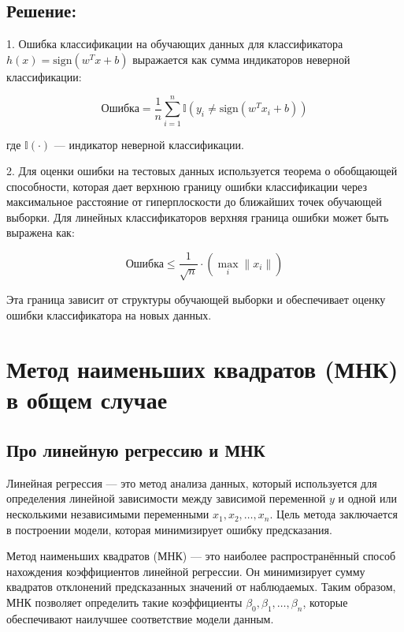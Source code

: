 \subsection*{Решение:}

1. Ошибка классификации на обучающих данных для классификатора \( h(x) = \text{sign}(w^T x + b) \) выражается как сумма индикаторов неверной классификации:

   \[
   \text{Ошибка} = \frac{1}{n} \sum_{i=1}^{n} \mathbb{I}(y_i \neq \text{sign}(w^T x_i + b))
   \]

   где \( \mathbb{I}(\cdot) \) — индикатор неверной классификации.

2. Для оценки ошибки на тестовых данных используется теорема о обобщающей способности, которая дает верхнюю границу ошибки классификации через максимальное расстояние от гиперплоскости до ближайших точек обучающей выборки. Для линейных классификаторов верхняя граница ошибки может быть выражена как:

   \[
   \text{Ошибка} \leq \frac{1}{\sqrt{n}} \cdot \left( \max_{i} \| x_i \| \right)
   \]

   Эта граница зависит от структуры обучающей выборки и обеспечивает оценку ошибки классификатора на новых данных.
   

\newpage

\section{Метод наименьших квадратов (МНК) в общем случае}

\subsection{Про линейную регрессию и МНК}

Линейная регрессия — это метод анализа данных, который используется для определения линейной зависимости между зависимой переменной \(y\) и одной или несколькими независимыми переменными \(x_1, x_2, \dots, x_n\). Цель метода заключается в построении модели, которая минимизирует ошибку предсказания.

Метод наименьших квадратов (МНК) — это наиболее распространённый способ нахождения коэффициентов линейной регрессии. Он минимизирует сумму квадратов отклонений предсказанных значений от наблюдаемых. Таким образом, МНК позволяет определить такие коэффициенты \( \beta_0, \beta_1, \dots, \beta_n \), которые обеспечивают наилучшее соответствие модели данным.


